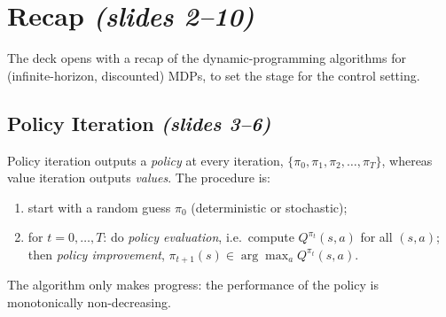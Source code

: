 \documentclass[11pt,a4paper]{article}
\newcommand{\slides}[1]{\emph{(slides #1)}}
\theoremstyle{plain}
\theoremstyle{definition}
\theoremstyle{remark}
\begin{document}
\newpage

\section{Recap \slides{2--10}}

The deck opens with a recap of the dynamic-programming algorithms for (infinite-horizon, discounted) MDPs, to set the stage for the control setting.

\subsection{Policy Iteration \slides{3--6}}

Policy iteration outputs a \emph{policy} at every iteration, $\{\pi_0,\pi_1,\pi_2,\dots,\pi_T\}$, whereas value iteration outputs \emph{values}. The procedure is:
\begin{enumerate}[nosep]
  \item start with a random guess $\pi_0$ (deterministic or stochastic);
  \item for $t=0,\dots,T$: do \emph{policy evaluation}, i.e.\ compute $Q^{\pi_t}(s,a)$ for all $(s,a)$; then \emph{policy improvement}, $\pi_{t+1}(s)\in\arg\max_a Q^{\pi_t}(s,a)$.
\end{enumerate}
The algorithm only makes progress: the performance of the policy is monotonically non-decreasing.
\end{document}
